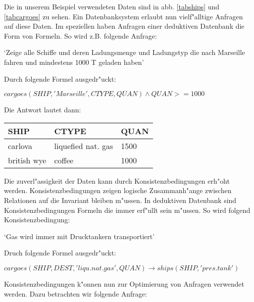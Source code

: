 Die in unserem Beispiel verwendeten Daten sind in abb. \ref{tabships} und
\ref{tabcargoes} zu sehen. Ein Datenbanksystem erlaubt nun vielf"alltige 
Anfragen auf diese Daten. Im speziellen haben Anfragen einer deduktiven
Datenbank die Form von Formeln. So wird z.B. folgende Anfrage:

\begin{center}
\begin{minipage}{10cm}
`Zeige alle Schiffe und deren Ladungsmenge und Ladungstyp die
nach Marseille fahren und mindestens 1000 T geladen haben'
\end{minipage}
\end{center}

Durch folgende Formel ausgedr"uckt:

\begin{center}
$cargoes(SHIP,'Marseille',CTYPE,QUAN) \wedge QUAN>=1000$
\end{center}

Die Antwort lautet dann:

\begin{center}
\begin{tabular}{l|l|l}
SHIP & CTYPE & QUAN \\
\hline
carlova & liquefied nat. gas & 1500 \\
british wye & coffee & 1000
\end{tabular}
\end{center}

Die zuverl"assigkeit der Daten kann durch Konsistenzbedingungen erh"oht werden.
Konsistenzbedingungen zeigen logische Zusammanh"ange zwischen Relationen auf die Invariant
bleiben m"ussen. In deduktiven Datenbank sind Konsistenzbedingungen Formeln die immer erf"ullt 
sein m"ussen. So wird folgend Konsistenzbedingung:

\begin{center}
\begin{minipage}{10cm}
`Gas wird immer mit Drucktankern transportiert'
\end{minipage}
\end{center}

Druch folgende Formel ausgedr"uckt:

\begin{center}
$cargoes(SHIP,DEST,'liqu. nat. gas',QUAN) \rightarrow ships(SHIP,'pres. tank')$
\end{center}

Konsistenzbedingungen k"onnen nun zur Optimierung von Anfragen verwendet werden. Dazu betrachten
wir folgende Anfrage:

